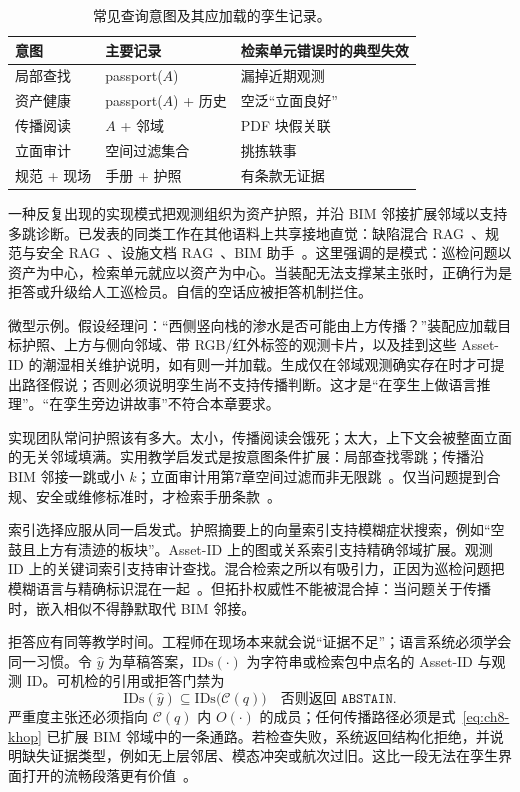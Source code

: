 \begin{table}[htbp]
\centering
\caption{常见查询意图及其应加载的孪生记录。}
\label{tab:ch8-intents}
\begin{tabular}{llp{4.8cm}}
\toprule
意图 & 主要记录 & 检索单元错误时的典型失效 \\
\midrule
局部查找 & passport($A$) & 漏掉近期观测 \\
资产健康 & passport($A$) + 历史 & 空泛``立面良好'' \\
传播阅读 & $A$ + 邻域 & PDF 块假关联 \\
立面审计 & 空间过滤集合 & 挑拣轶事 \\
规范 + 现场 & 手册 + 护照 & 有条款无证据 \\
\bottomrule
\end{tabular}
\end{table}

一种反复出现的实现模式把观测组织为资产护照，并沿 BIM 邻接扩展邻域以支持多跳诊断。已发表的同类工作在其他语料上共享接地直觉：缺陷混合 RAG~\cite{jeon2025hybridrag}、规范与安全 RAG~\cite{joffe2025buildingcodes,lee2024ragsafety}、设施文档 RAG~\cite{krutli2025fmrags}、BIM 助手~\cite{zheng2023bimassistant}。这里强调的是模式：巡检问题以资产为中心，检索单元就应以资产为中心。当装配无法支撑某主张时，正确行为是拒答或升级给人工巡检员。自信的空话应被拒答机制拦住。

微型示例。假设经理问：``西侧竖向栈的渗水是否可能由上方传播？''装配应加载目标护照、上方与侧向邻域、带 RGB/红外标签的观测卡片，以及挂到这些 Asset-ID 的潮湿相关维护说明，如有则一并加载。生成仅在邻域观测确实存在时才可提出路径假说；否则必须说明孪生尚不支持传播判断。这才是``在孪生上做语言推理''。``在孪生旁边讲故事''不符合本章要求。

实现团队常问护照该有多大。太小，传播阅读会饿死；太大，上下文会被整面立面的无关邻域填满。实用教学启发式是按意图条件扩展：局部查找零跳；传播沿 BIM 邻接一跳或小 $k$；立面审计用第7章空间过滤而非无限跳~\cite{peng2024,zhang2025}。仅当问题提到合规、安全或维修标准时，才检索手册条款~\cite{joffe2025buildingcodes,lee2024ragsafety}。

索引选择应服从同一启发式。护照摘要上的向量索引支持模糊症状搜索，例如``空鼓且上方有渍迹的板块''。Asset-ID 上的图或关系索引支持精确邻域扩展。观测 ID 上的关键词索引支持审计查找。混合检索之所以有吸引力，正因为巡检问题把模糊语言与精确标识混在一起~\cite{jeon2025hybridrag,krutli2025fmrags}。但拓扑权威性不能被混合掉：当问题关于传播时，嵌入相似不得静默取代 BIM 邻接。

拒答应有同等教学时间。工程师在现场本来就会说``证据不足''；语言系统必须学会同一习惯。令 $\hat{y}$ 为草稿答案，$\mathrm{IDs}(\cdot)$ 为字符串或检索包中点名的 Asset-ID 与观测 ID。可机检的引用或拒答门禁为
\begin{equation}
\label{eq:ch8-cite}
\mathrm{IDs}(\hat{y})\subseteq\mathrm{IDs}\bigl(\mathcal{C}(q)\bigr)
\quad\text{否则返回 }\texttt{ABSTAIN}.
\end{equation}
严重度主张还必须指向 $\mathcal{C}(q)$ 内 $O(\cdot)$ 的成员；任何传播路径必须是式~\eqref{eq:ch8-khop} 已扩展 BIM 邻域中的一条通路。若检查失败，系统返回结构化拒绝，并说明缺失证据类型，例如无上层邻居、模态冲突或航次过旧。这比一段无法在孪生界面打开的流畅段落更有价值~\cite{ji2023,shuster2021}。

